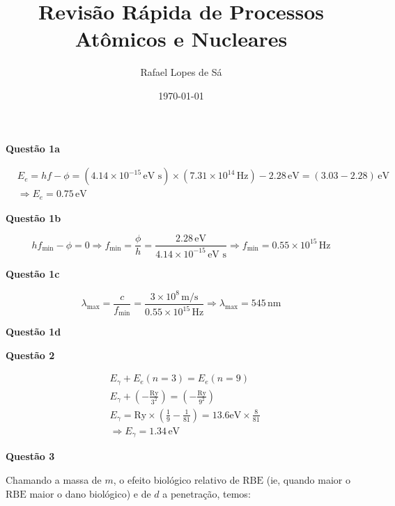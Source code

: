 \documentclass{article}
\title{Revis\~ao R\'apida de Processos At\^omicos e Nucleares}
\author{Rafael Lopes de S\'a}
\date{\today}
\begin{document}
\textbf{Quest\~ao 1a}

\begin{equation}
\begin{split}
&E_e = hf - \phi = (4.14\times 10^{-15}\,\text{eV s})\times (7.31\times 10^{14}\,\text{Hz})-2.28\,\text{eV} = (3.03 - 2.28)\,\text{eV}\\
& \Rightarrow \boxed{E_e= 0.75\,\text{eV}}
\end{split}
\end{equation}

\textbf{Quest\~ao 1b}

\begin{equation}
hf_{\text{min}} - \phi = 0 \Rightarrow f_{\text{min}} = \frac{\phi}{h} = \frac{2.28\,\text{eV}}{4.14\times 10^{-15}\,\text{eV s}} \Rightarrow \boxed{f_{\text{min}} = 0.55\times 10^{15}\,\text{Hz}}
\end{equation}

\textbf{Quest\~ao 1c}

\begin{equation}
\lambda_{\text{max}} = \frac{c}{f_{\text{min}}} = \frac{3\times 10^{8}\,\text{m/s}}{0.55\times 10^{15}\,\text{Hz}} \Rightarrow \boxed{\lambda_{\text{max}} = 545\,\text{nm}}
\end{equation}

\textbf{Quest\~ao 1d}

\vspace{0.3cm}
\vspace{0.3cm}

\textbf{Quest\~ao 2}

\begin{equation}
\begin{split}
&E_{\gamma} + E_e(n=3) = E_e(n=9)\\
&E_{\gamma} + \left(-\frac{\text{Ry}}{3^2}\right) = \left(-\frac{\text{Ry}}{9^2}\right)\\
&E_{\gamma} = \text{Ry}\times\left(\frac{1}{9} - \frac{1}{81}\right) = 13.6\text{eV}\times\frac{8}{81}\\
&\Rightarrow \boxed{E_{\gamma} = 1.34\,\text{eV}}
\end{split}
\end{equation}

\textbf{Quest\~ao 3}
\vspace{0.3cm}

Chamando a massa de $m$, o efeito biol\'ogico relativo de $\text{RBE}$ (ie, quando maior o $\text{RBE}$ maior o dano biol\'ogico) e de $d$ a penetra\c c\~ao, temos:
\end{document}
